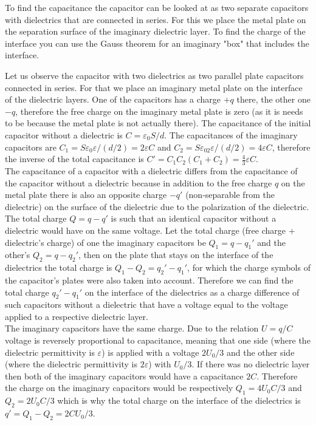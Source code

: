 {\ifEngHint
To find the capacitance the capacitor can be looked at as two separate capacitors with dielectrics that are connected in series. For this we place the metal plate on the separation surface of the imaginary dielectric layer. To find the charge of the interface you can use the Gauss theorem for an imaginary "box" that includes the interface.
\fi


\ifEngSolution
Let us observe the capacitor with two dielectrics as two parallel plate capacitors connected in series. For that we place an imaginary metal plate on the interface of the dielectric layers. One of the capacitors has a charge $+q$ there, the other one $-q$, therefore the free charge on the imaginary metal plate is zero (as it is needs to be because the metal plate is not actually there). The capacitance of the initial capacitor without a dielectric is $C=\varepsilon_0S/d$. The capacitances of the imaginary capacitors are $C_1=S\varepsilon_0\varepsilon/(d/2)=2\varepsilon C$ and $C_2=S\varepsilon_02\varepsilon/(d/2)=4\varepsilon C$, therefore the inverse of the total capacitance is $C'=C_1C_2(C_1+C_2)=\frac 43\varepsilon C$. \\
The capacitance of a capacitor with a dielectric differs from the capacitance of the capacitor without a dielectric because in addition to the free charge $q$ on the metal plate there is also an opposite charge $-q'$ (non-separable from the dielectric) on the surface of the dielectric due to the polarization of the dielectric. The total charge $Q=q-q'$ is such that an identical capacitor without a dielectric would have on the same voltage. Let the total charge (free charge + dielectric’s charge) of one the imaginary capacitors be $Q_1=q-q_1'$ and the other’s $Q_2=q-q_2'$, then on the plate that stays on the interface of the dielectrics the total charge is $Q_1-Q_2=q_2'-q_1'$, for which the charge symbols of the capacitor’s plates were also taken into account. Therefore we can find the total charge $q_2'-q_1'$ on the interface of the dielectrics as a charge difference of such capacitors without a dielectric that have a voltage equal to the voltage applied to a respective dielectric layer.\\
The imaginary capacitors have the same charge. Due to the relation $U=q/C$ voltage is reversely proportional to capacitance, meaning that one side (where the dielectric permittivity is $\varepsilon$) is applied with a voltage $2U_0/3$ and the other side (where the dielectric permittivity is $2\varepsilon$) with $U_0/3$. If there was no dielectric layer then both of the imaginary capacitors would have a capacitance $2C$. Therefore the charge on the imaginary capacitors would be respectively $Q_1=4U_0C/3$ and $Q_2=2U_0C/3$ which is why the total charge on the interface of the dielectrics is $q'=Q_1-Q_2=2CU_0/3$.\\

}
